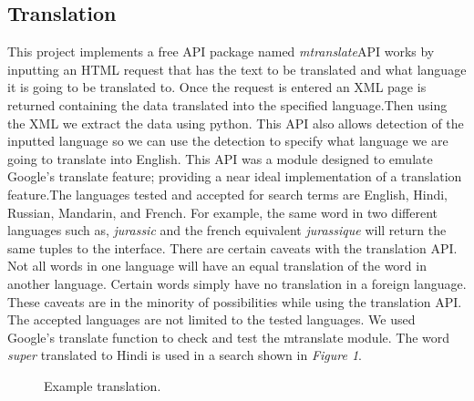 \documentclass{sig-alternate-05-2015}
\begin{document}
\subsection{Translation}
 This project implements a free API package named \textit{mtranslate}\cite{mtranslate}API works by inputting an HTML request that has the text to be translated and what language it is going to be translated to. Once the request is entered an XML page is returned containing the data translated into the specified language.Then using the XML we extract the data using python. This API also allows detection of the inputted language so we can use the detection to specify what language we are going to translate into English. This API was a module designed to emulate Google's translate feature; providing a near ideal implementation of a translation feature.The languages tested and accepted for search terms are English, Hindi, Russian, Mandarin, and French. For example, the same word in two different languages such as, \textit{jurassic} and the french equivalent \textit{jurassique} will return the same tuples to the interface. There are certain caveats with the translation API. Not all words in one language will have an equal translation of the word in another language. Certain words simply have no translation in a foreign language. These caveats are in the minority of possibilities while using the translation API. The accepted languages are not limited to the tested languages. We used Google's translate function to check and test the mtranslate module. The word \textit{super} translated to Hindi is used in a search shown in \textit{Figure 1}.
 ~
\begin{figure}[h]
\center
{}
\caption{Example translation.}
\center
\end{figure}
~
\\
\end{document}
